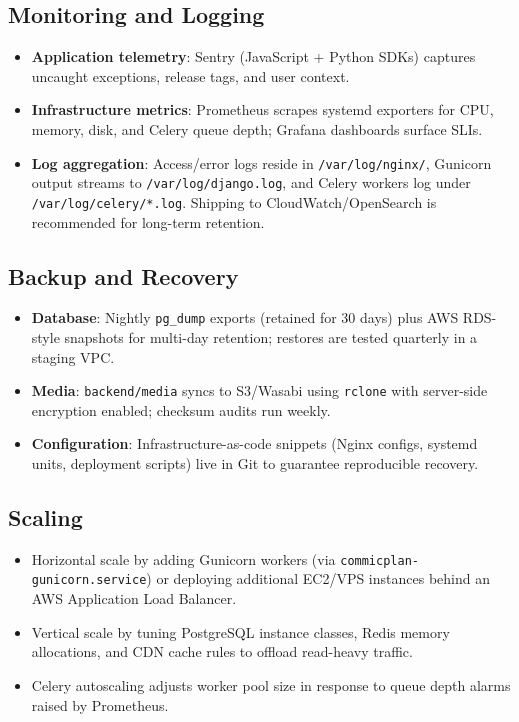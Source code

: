 \documentclass[11pt]{article}
\begin{document}
\subsection{Monitoring and Logging}
\begin{itemize}[leftmargin=*]
  \item \textbf{Application telemetry}: Sentry (JavaScript + Python SDKs) captures uncaught exceptions, release tags, and user context.
  \item \textbf{Infrastructure metrics}: Prometheus scrapes systemd exporters for CPU, memory, disk, and Celery queue depth; Grafana dashboards surface SLIs.
  \item \textbf{Log aggregation}: Access/error logs reside in \verb|/var/log/nginx/|, Gunicorn output streams to \verb|/var/log/django.log|, and Celery workers log under \verb|/var/log/celery/*.log|. Shipping to CloudWatch/OpenSearch is recommended for long-term retention.
\end{itemize}

\subsection{Backup and Recovery}
\begin{itemize}[leftmargin=*]
  \item \textbf{Database}: Nightly \texttt{pg\_dump} exports (retained for 30 days) plus AWS RDS-style snapshots for multi-day retention; restores are tested quarterly in a staging VPC.
  \item \textbf{Media}: \texttt{backend/media} syncs to S3/Wasabi using \texttt{rclone} with server-side encryption enabled; checksum audits run weekly.
  \item \textbf{Configuration}: Infrastructure-as-code snippets (Nginx configs, systemd units, deployment scripts) live in Git to guarantee reproducible recovery.
\end{itemize}

\subsection{Scaling}
\begin{itemize}[leftmargin=*]
  \item Horizontal scale by adding Gunicorn workers (via \texttt{commicplan-gunicorn.service}) or deploying additional EC2/VPS instances behind an AWS Application Load Balancer.
  \item Vertical scale by tuning PostgreSQL instance classes, Redis memory allocations, and CDN cache rules to offload read-heavy traffic.
  \item Celery autoscaling adjusts worker pool size in response to queue depth alarms raised by Prometheus.
\end{itemize}
\end{document}
